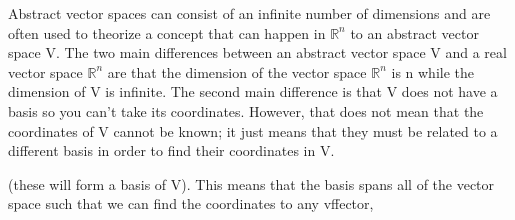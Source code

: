 Abstract vector spaces can consist of an infinite number of dimensions and are often used to theorize a concept that can happen in $\mathbb{R}^n$ to an abstract vector space V. The two main differences between an abstract vector space V and a real vector space $\mathbb{R}^n$ are that the dimension of the vector space $\mathbb{R}^n$ is n while the dimension of V is infinite. The second main difference is that V does not have a basis so you can't take its coordinates. However, that does not mean that the coordinates of V cannot be known; it just means that they must be related to a different basis in order to find their coordinates in V.

(these will form a basis of V). This means that the basis spans all of the vector space such that we can find the coordinates to any vffector,



